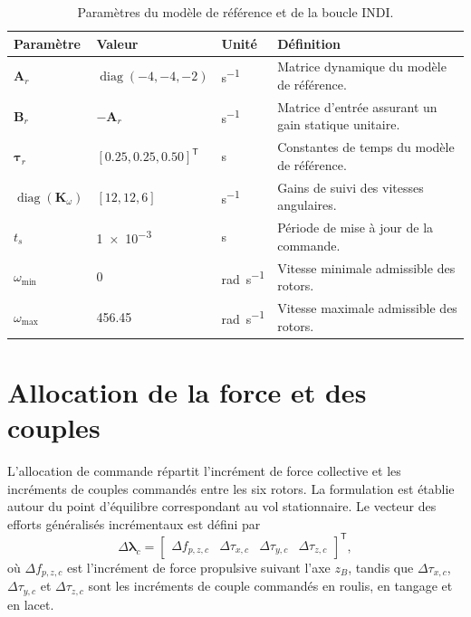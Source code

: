 \documentclass[11pt,a4paper,oneside]{report}
\newcommand{\vect}[1]{\bm{#1}}
\newcommand{\mat}[1]{\bm{#1}}
\newcommand{\trans}{^{\mathsf T}}
\newcommand{\diag}{\operatorname{diag}}
\begin{document}
\begin{table}[H]
	\centering
	\caption{Paramètres du modèle de référence et de la boucle INDI.}
	\label{tab_indi_parameters}
	\begin{tabularx}{\textwidth}{@{}L{5.0cm}L{4.2cm}L{2.5cm}Y@{}}
		\toprule
		\textbf{Paramètre} &
		\textbf{Valeur} &
		\textbf{Unité} &
		\textbf{Définition}\\
		\midrule
		$\mat A_r$ &
		$\diag(-4,-4,-2)$ &
		\si{s^{-1}} &
		Matrice dynamique du modèle de référence.\\
		$\mat B_r$ &
		$-\mat A_r$ &
		\si{s^{-1}} &
		Matrice d'entrée assurant un gain statique unitaire.\\
		$\vect\tau_r$ &
		$[0.25,0.25,0.50]\trans$ &
		\si{s} &
		Constantes de temps du modèle de référence.\\
		$\diag(\mat K_\omega)$ &
		$[12,12,6]$ &
		\si{s^{-1}} &
		Gains de suivi des vitesses angulaires.\\
		$t_s$ &
		\num{1e-3} &
		\si{s} &
		Période de mise à jour de la commande.\\
		$\omega_{\min}$ &
		\num{0} &
		\si{rad.s^{-1}} &
		Vitesse minimale admissible des rotors.\\
		$\omega_{\max}$ &
		\num{456.45} &
		\si{rad.s^{-1}} &
		Vitesse maximale admissible des rotors.\\
		\bottomrule
	\end{tabularx}
\end{table}

\section{Allocation de la force et des couples}

L'allocation de commande répartit l'incrément de force collective et les incréments de couples commandés entre les six rotors. La formulation est établie autour du point d'équilibre correspondant au vol stationnaire. Le vecteur des efforts généralisés incrémentaux est défini par
\begin{equation}
	\Delta\vect\lambda_c
	=
	\begin{bmatrix}
		\Delta f_{p,z,c} &
		\Delta\tau_{x,c} &
		\Delta\tau_{y,c} &
		\Delta\tau_{z,c}
	\end{bmatrix}\trans,
	\label{eq_incremental_commanded_generalized_wrench}
\end{equation}
où $\Delta f_{p,z,c}$ est l'incrément de force propulsive suivant l'axe $z_B$, tandis que $\Delta\tau_{x,c}$, $\Delta\tau_{y,c}$ et $\Delta\tau_{z,c}$ sont les incréments de couple commandés en roulis, en tangage et en lacet.
\end{document}
